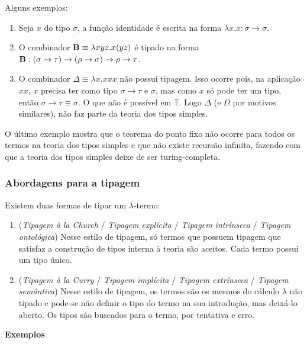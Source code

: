 \documentclass[../main.tex]{subfiles}
\begin{document}
Alguns exemplos:

\begin{enumerate}
    \item Seja $x$ do tipo $\sigma$, a função identidade é escrita na forma $\lambda x . x : \sigma \to \sigma$.
    \item O combinador $\text{\textbf{B}} \equiv \lambda xyz . x(yz)$ é tipado na forma $\text{\textbf{B}} : (\sigma \to \tau) \to (\rho \to \sigma) \to \rho \to \tau$.
    \item O combinador $\Delta \equiv \lambda x . xxx$ não possui tipagem. Isso ocorre pois, na aplicação $xx$, $x$ precisa ter como tipo $\sigma \to \tau$ e $\sigma$, mas como $x$ só pode ter um tipo, então $\sigma \to \tau \equiv \sigma$. O que não é possível em $\mathbb{T}$. Logo $\Delta$ (e $\Omega$ por motivos similares), não faz parte da teoria dos tipos simples.
\end{enumerate}

O último exemplo mostra que o teorema do ponto fixo não ocorre para todos os termos na teoria dos tipos simples e que não existe recursão infinita, fazendo com que a teoria dos tipos simples deixe de ser turing-completa.

\subsubsection{Abordagens para a tipagem}

Existem duas formas de tipar um $\lambda$-termo:

\begin{enumerate}
    \item (\emph{Tipagem à la Church} / \emph{Tipagem explícita} / \emph{Tipagem intrínseca} / \emph{Tipagem ontológica}) Nesse estilo de tipagem, só termos que possuem tipagem que satisfaz a construção de tipos interna à teoria são aceitos. Cada termo possui um tipo único.
    \item (\emph{Tipagem à la Curry} / \emph{Tipagem implícita} / \emph{Tipagem extrínseca} / \emph{Tipagem semântica}) Nesse estilo de tipagem, os termos são os mesmos do cálculo $\lambda$ não tipado e pode-se não definir o tipo do termo na sua introdução, mas deixá-lo aberto. Os tipos são buscados para o termo, por tentativa e erro.
\end{enumerate}


\textbf{Exemplos}
\end{document}
